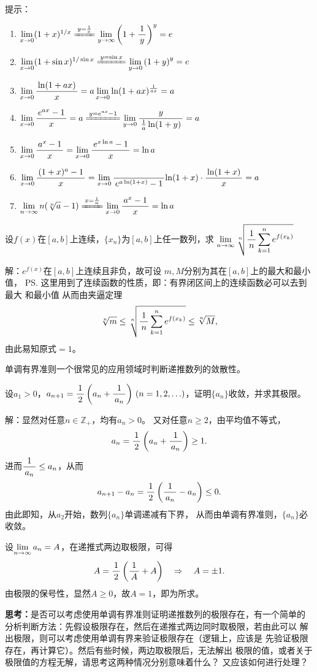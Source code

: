 \ifhint
提示：
\begin{enumerate}[(1)]
	\setlength{\itemindent}{1cm}
	\item $\limx{0}(1+x)^{1/x}
	\xlongequal{y=\frac1x}
	\lim\limits_{y\to\infty}\left(1+\df1y\right)^y=e$ 
	\item $\limx 0(1+\sin x)^{1/\sin x}
	\xlongequal{y=\sin x}\lim\limits_{y\to0}\left(1+y\right)^y=e$ 
	\item $\lim\limits_{x\to{0}}\displaystyle\frac{\,{\ln(1+ax)}\,}{\,{x}\,}
	=a\lim\limits_{x\to{0}}\ln(1+ax)^{\frac1{ax}}=a$
	\item $\limx 0\df{e^{ax}-1}{x}=a
	\xlongequal{y=e^{ax}-1}
	\lim\limits_{y\to0}\df{y}{\frac1a\ln(1+y)}=a$ 
	\item $\lim\limits_{x\to{0}}\displaystyle\frac{\,{a^x-1}\,}{\,{x}\,}
	=\lim\limits_{x\to{0}}\displaystyle\frac{\,{e^{x\ln a}-1}\,}{\,{x}\,}=\ln a$ 
	\item $\lim\limits_{x\to{0}}\displaystyle\frac{\,{(1+x)^a-1}\,}{\,{x}\,}
	=\lim\limits_{x\to{0}}\displaystyle\frac{\,{}\,}{\,{e^{a\ln(1+x)}-1}\,}{\ln(1+x)}
	\cdot\displaystyle\frac{\,{\ln(1+x)}\,}{\,{x}\,}=a$
	\item $\limn n(\sqrt[n]{a}-1)
	\xlongequal{x=\frac1n}
	\limx0\df{a^x-1}x=\ln a$ 
\end{enumerate}
\fi

\bs
\egz 设$f(x)$在$[a,b]$上连续，$\{x_n\}$为$[a,b]$上任一数列，求
$\lim\limits_{n\to\infty}\sqrt[n]{\displaystyle\frac{\,{1}\,}{\,{n}\,}\sum\limits_{k=1}^ne^{f(x_k)}}$

解：$e^{f(x)}$在$[a,b]$上连续且非负，故可设
$m,M$分别为其在$[a,b]$上的最大和最小值，
\ps{这里用到了连续函数的性质，即：有界闭区间上的连续函数必可以去到最大
和最小值}
从而由夹逼定理
$$\sqrt[n]m\leq\sqrt[n]{\displaystyle\frac{\,{1}\,}{\,{n}\,}\sum\limits_{k=1}^ne^{f(x_k)}}\leq\sqrt[n]M,$$
由此易知原式$=1$。\fin

\bs
单调有界准则一个很常见的应用领域时判断递推数列的敛散性。

\egz 
设$a_1>0$，$a_{n+1}=\displaystyle\frac{\,{1}\,}{\,{2}\,}\left(a_n+\displaystyle\frac{\,{1}\,}{\,{a_n}\,}\right)\,
(n=1,2,\ldots)$，证明$\{a_n\}$收敛，并求其极限。

解：显然对任意$n\in\mathbb{Z}_+$，均有$a_n>0$。
又对任意$n\geq2$，由平均值不等式，
$$a_n=\displaystyle\frac{\,{1}\,}{\,{2}\,}\left(a_n+\displaystyle\frac{\,{1}\,}{\,{a_n}\,}\right)\geq 1.$$
进而$\displaystyle\frac{\,{1}\,}{\,{a_n}\,}\leq a_n$，从而
$$a_{n+1}-a_n=\displaystyle\frac{\,{1}\,}{\,{2}\,}\left(\displaystyle\frac{\,{1}\,}{\,{a_n}\,}-a_n\right)\leq0.$$
由此即知，从$a_2$开始，数列$\{a_n\}$单调递减有下界，
从而由单调有界准则，$\{a_n\}$必收敛。

设$\lim\limits_{n\to\infty} a_n=A$，在递推式两边取极限，可得
$$A=\displaystyle\frac{\,{1}\,}{\,{2}\,}\left(\displaystyle\frac{\,{1}\,}{\,{A}\,}+A\right)\quad\Rightarrow\quad A=\pm1.$$
由极限的保号性，显然$A\geq0$，故$A=1$，即为所求。\fin

{\bf 思考：}是否可以考虑使用单调有界准则证明递推数列的极限存在，有一个简单的
分析判断方法：先假设极限存在，然后在递推式两边同时取极限，若由此可以
解出极限，则可以考虑使用单调有界来验证极限存在（逻辑上，应该是
先验证极限存在，再计算它）。然后有些时候，两边取极限后，无法解出
极限的值，或者关于极限值的方程无解，请思考这两种情况分别意味着什么？
又应该如何进行处理？

